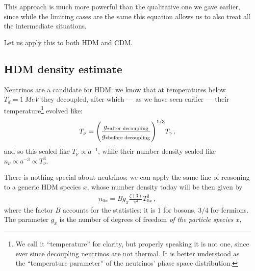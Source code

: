 \documentclass[main.tex]{subfiles}
\begin{document}
This approach is much more powerful than the qualitative one we gave earlier, since while the limiting cases are the same this equation allows us to also treat all the intermediate situations.

Let us apply this to both HDM and CDM.

\subsection{HDM density estimate}

Neutrinos are a candidate for HDM: we know that at temperatures below \(T_d = \SI{1}{MeV}\) they decoupled, after which --- as we have seen earlier --- their temperature\footnote{We call it ``temperature'' for clarity, but properly speaking it is not one, since ever since decoupling neutrinos are not thermal. It is better understood as the ``temperature parameter'' of the neutrinos' phase space distribution.} evolved like:
%
\begin{align}
  T_{\nu } = \qty(\frac{g_{* \text{after decoupling}}}{g_{* \text{before decoupling}}})^{1/3} T_{\gamma }
\,,
\end{align}
%
and so this scaled like \(T_\nu \propto a^{-1}\), while their number density scaled like \(n_\nu \propto a^{-3} \propto T_\nu^{3}\).


%

There is nothing special about neutrinos: we can apply the same line of reasoning to a generic HDM species \(x\), whose number density today will be then given by
%
\begin{align}
  n_{0x} = B g_{x} \frac{\zeta (3)}{\pi^2} T_{0x}^3
\,,
\end{align}
%
where the factor \(B\) accounts for the statistics: it is 1 for bosons, \(3/4\) for fermions. The parameter \(g_x\) is the number of degrees of freedom \emph{of the particle species \(x\)}, 
\end{document}
